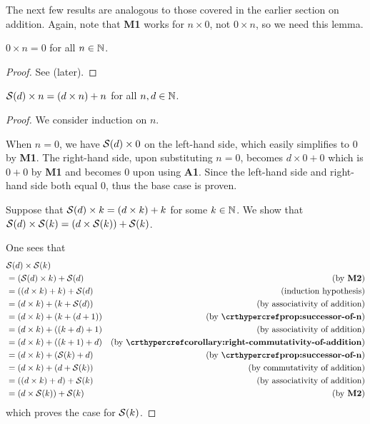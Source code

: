 The next few results are analogous to those covered in the earlier section on addition. Again, note that \textbf{M1} works for $n \times 0$, not $0 \times n$, so we need this lemma.

\begin{lemma}\label{lemma:product-of-0-and-n}
    $0 \times n = 0$ for all $n \in \mathbb{N}$.
\end{lemma}

\begin{proof}
    See  (later).
\end{proof}

\begin{lemma}\label{lemma:product-of-successor-and-n}
    ${\mathcal{S}(d)} \times n = (d \times n) + n$ for all $n, d \in \mathbb{N}$.
\end{lemma}
\begin{proof}
    We consider induction on $n$.

    When $n = 0$, we have ${\mathcal{S}(d)} \times 0$ on the left-hand side, which easily simplifies to 0 by \textbf{M1}. The right-hand side, upon substituting $n = 0$, becomes $d \times 0 + 0$ which is $0 + 0$ by \textbf{M1} and becomes 0 upon using \textbf{A1}. Since the left-hand side and right-hand side both equal 0, thus the base case is proven.

    Suppose that ${\mathcal{S}(d)} \times k = (d \times k) + k$ for some $k \in \mathbb{N}$. We show that ${\mathcal{S}(d)} \times {\mathcal{S}(k)} = \left(d \times {\mathcal{S}(k)}\right) + {\mathcal{S}(k)}$.

    One sees that
    \begin{align*}
        &\Successor{d} \times \Successor{k}\\
        &= \left(\Successor{d} \times k\right) + \Successor{d} & (\text{by \textbf{M2}})\\
        &= \left((d \times k) + k\right) + \Successor{d} & (\text{induction hypothesis})\\
        &= (d \times k) + \left(k + \Successor{d}\right) & (\text{by associativity of addition})\\
        &= (d \times k) + \left(k + (d + 1)\right) & (\text{by \myref{prop:successor-of-n}})\\
        &= (d \times k) + \left((k + d) + 1\right) & (\text{by associativity of addition})\\
        &= (d \times k) + \left((k + 1) + d\right) & (\text{by \myref{corollary:right-commutativity-of-addition}})\\
        &= (d \times k) + \left(\Successor{k} + d\right) & (\text{by \myref{prop:successor-of-n}})\\
        &= (d \times k) + \left(d + \Successor{k}\right) & (\text{by commutativity of addition})\\
        &= \left((d \times k) + d\right) + \Successor{k} & (\text{by associativity of addition})\\
        &= \left(d \times \Successor{k}\right) + \Successor{k} & (\text{by \textbf{M2}})
    \end{align*}
    which proves the case for ${\mathcal{S}(k)}$.
\end{proof}

